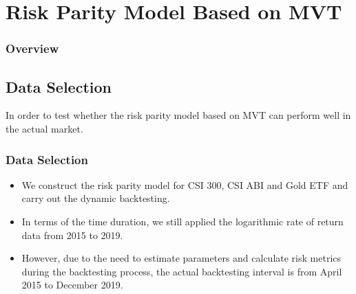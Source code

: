 \documentclass{beamer}
\begin{document}
\section{Risk Parity Model Based on MVT}
\begin{frame}

\frametitle{Overview} %
\tableofcontents[currentsection] %
\end{frame}

\subsection{Data Selection}
\begin{frame}
In order to test whether the risk parity model based on MVT can perform well in the actual market.
\frametitle{Data Selection}
\begin{itemize}
    \item We construct the risk parity model for CSI 300, CSI ABI and Gold ETF and carry out the dynamic backtesting.
    \item In terms of the time duration, we still applied the logarithmic rate of return data from 2015 to 2019.
    \item However, due to the need to estimate parameters and calculate risk metrics during the backtesting process, the actual backtesting interval is from April 2015 to December 2019.
\end{itemize}
\end{frame}
\end{document}
